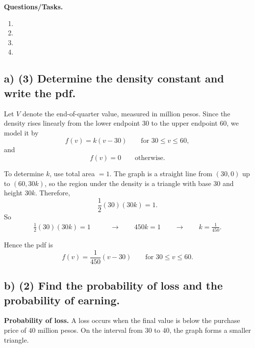 	\textbf{Questions/Tasks.}
	\begin{enumerate}[label=\textbf{\alph*)}]
		\item {}
		\item {}
		\item {}
		\item {}
	\end{enumerate}
	
	\subsection*{a) \textbf{(3)} Determine the density constant and write the pdf.}
	\label{subsec:online-coffee-sales-investment-c1-a}
	Let $V$ denote the end-of-quarter value, measured in million pesos. Since the density rises linearly from the lower endpoint $30$ to the upper endpoint $60$, we model it by
	\[
	f(v)=k(v-30)\qquad \text{for }30\le v\le 60,
	\]
	and
	\[
	f(v)=0\qquad \text{otherwise.}
	\]
	
	To determine $k$, use total area $=1$. The graph is a straight line from $(30,0)$ up to $(60,30k)$, so the region under the density is a triangle with base $30$ and height $30k$. Therefore,
	\[
	\frac12(30)(30k)=1.
	\]
	So
	\[
	\begin{aligned}
		\frac12(30)(30k)=1
		&\qquad \longrightarrow \qquad 450k=1
		\qquad \longrightarrow \qquad k=\frac{1}{450}.
	\end{aligned}
	\]
	
	Hence the pdf is
	\[
	f(v)=\frac{1}{450}(v-30)\qquad \text{for }30\le v\le 60.
	\]
	
	
	\subsection*{b) \textbf{(2)} Find the probability of loss and the probability of earning.}
	\label{subsec:online-coffee-sales-investment-c1-b}
	\textbf{Probability of loss.} A loss occurs when the final value is below the purchase price of $40$ million pesos. On the interval from $30$ to $40$, the graph forms a smaller triangle.
	
